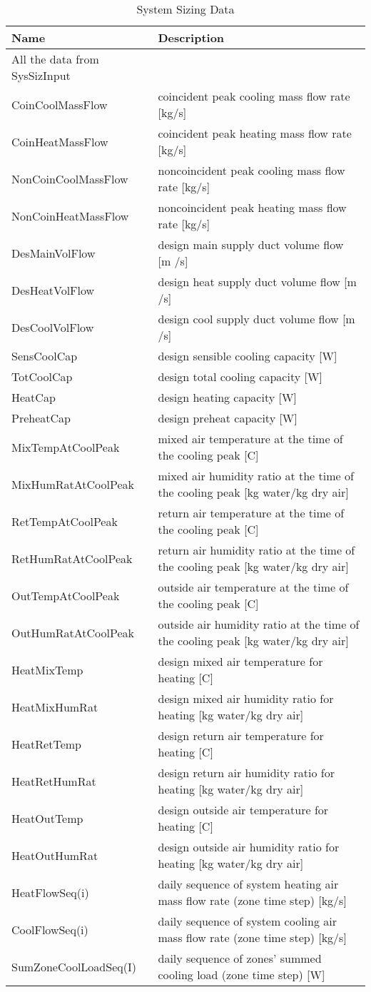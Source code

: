 \begin{longtable}[c]{p{2.0in}p{4.0in}}
\caption{System Sizing Data \protect \label{table:system-sizing-data}}\\
\toprule 
Name & Description \tabularnewline \midrule
\endhead
All the data from SysSizInput &  \tabularnewline
CoinCoolMassFlow & coincident peak cooling mass flow rate [kg/s] \tabularnewline
CoinHeatMassFlow & coincident peak heating mass flow rate [kg/s] \tabularnewline
NonCoinCoolMassFlow & noncoincident peak cooling mass flow rate [kg/s] \tabularnewline
NonCoinHeatMassFlow & noncoincident peak heating mass flow rate [kg/s] \tabularnewline
DesMainVolFlow & design main supply duct volume flow [m  /s] \tabularnewline
DesHeatVolFlow & design heat supply duct volume flow [m  /s] \tabularnewline
DesCoolVolFlow & design cool supply duct volume flow [m  /s] \tabularnewline
SensCoolCap & design sensible cooling capacity [W] \tabularnewline
TotCoolCap & design total cooling capacity [W] \tabularnewline
HeatCap & design heating capacity [W] \tabularnewline
PreheatCap & design preheat capacity [W] \tabularnewline
MixTempAtCoolPeak & mixed air temperature at the time of the cooling peak [C] \tabularnewline
MixHumRatAtCoolPeak & mixed air humidity ratio at the time of the cooling peak [kg water/kg dry air] \tabularnewline
RetTempAtCoolPeak & return air temperature at the time of the cooling peak [C] \tabularnewline
RetHumRatAtCoolPeak & return air humidity ratio at the time of the cooling peak [kg water/kg dry air] \tabularnewline
OutTempAtCoolPeak & outside air temperature at the time of the cooling peak [C] \tabularnewline
OutHumRatAtCoolPeak & outside air humidity ratio at the time of the cooling peak [kg water/kg dry air] \tabularnewline
HeatMixTemp & design mixed air temperature for heating [C] \tabularnewline
HeatMixHumRat & design mixed air humidity ratio for heating [kg water/kg dry air] \tabularnewline
HeatRetTemp & design return air temperature for heating [C] \tabularnewline
HeatRetHumRat & design return air humidity ratio for heating [kg water/kg dry air] \tabularnewline
HeatOutTemp & design outside air temperature for heating [C] \tabularnewline
HeatOutHumRat & design outside air humidity ratio for heating [kg water/kg dry air] \tabularnewline
HeatFlowSeq(i) & daily sequence of system heating air mass flow rate (zone time step) [kg/s] \tabularnewline
CoolFlowSeq(i) & daily sequence of system cooling air mass flow rate (zone time step) [kg/s] \tabularnewline
SumZoneCoolLoadSeq(I) & daily sequence of zones' summed cooling load (zone time step) [W] \tabularnewline

\end{longtable}
